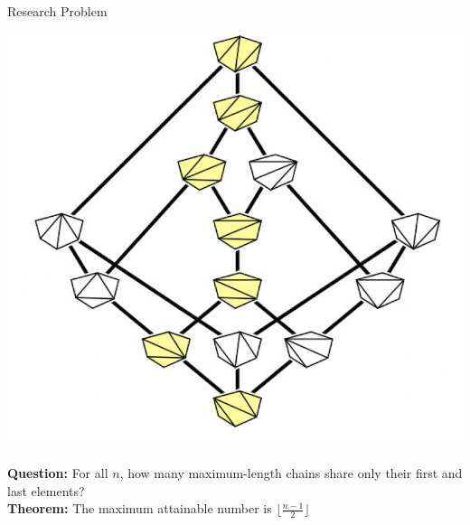 \documentclass[xcolor=x11names,compress,t]{beamer}
\begin{document}


\begin{frame}{Research Problem}
    \begin{center}
        \includegraphics[scale = .3]{ExA.png}
    \end{center}

    \textbf{Question:} For all $n$, how many maximum-length chains share only their first and last elements?\\ \pause
    \vspace{0.5cm}
    \textbf{Theorem:} The maximum attainable number is $\lfloor\frac{n-1}{2}\rfloor$
\end{frame}
\end{document}
